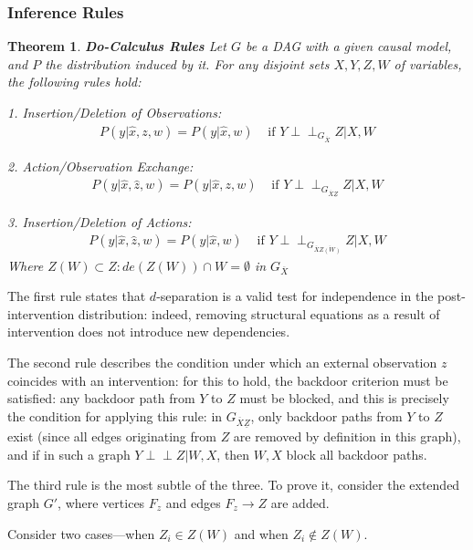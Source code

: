 \documentclass[fleqn]{article}
\newcommand{\independent}{\perp \!\!\! \perp}
\newtheorem{theorem}{Theorem}
\numberwithin{equation}{section}
\numberwithin{theorem}{section}
\numberwithin{figure}{section}
\numberwithin{lemma}{section}
\numberwithin{corollary}{section}
\begin{document}
\subsubsection*{Inference Rules}

\begin{theorem}
	\textbf{Do-Calculus Rules} Let $G$ be a DAG with a given causal model, and $P$ the distribution induced by it. For any disjoint sets $X, Y, Z, W$ of variables, the following rules hold:
	
	1. Insertion/Deletion of Observations:
	\begin{align}
		P(y|\hat x, z, w) = P(y|\hat x, w) & \text{ if } Y \independent_{G_{\overline{X}}} Z | X, W
	\end{align}
	
	2. Action/Observation Exchange:
	\begin{align}
		P(y|\hat x, \hat z, w) = P(y|\hat x, z, w) & \text{ if } Y \independent_{G_{\overline{X}\underline{Z}}} Z | X, W
	\end{align}
	
	3. Insertion/Deletion of Actions:
	\begin{align}
		P(y|\hat x, \hat z, w) = P(y|\hat x, w) & \text{ if } Y \independent_{G_{\overline{X}\overline{Z(W)}}} Z | X, W
	\end{align}
	Where $Z(W) \subset Z: de(Z(W)) \cap W = \emptyset$ in $G_{\overline{X}}$
\end{theorem}

The first rule states that $d$-separation is a valid test for independence in the post-intervention distribution: indeed, removing structural equations as a result of intervention does not introduce new dependencies.

The second rule describes the condition under which an external observation $z$ coincides with an intervention: for this to hold, the backdoor criterion must be satisfied: any backdoor path from $Y$ to $Z$ must be blocked, and this is precisely the condition for applying this rule: in $G_{\overline{X}\underline{Z}}$, only backdoor paths from $Y$ to $Z$ exist (since all edges originating from $Z$ are removed by definition in this graph), and if in such a graph $Y \independent Z |W, X$, then $W, X$ block all backdoor paths.

The third rule is the most subtle of the three. To prove it, consider the extended graph $G'$, where vertices $F_z$ and edges $F_z \rightarrow Z$ are added.

Consider two cases—when $Z_i \in Z(W)$ and when $Z_i \notin Z(W)$.
\end{document}
